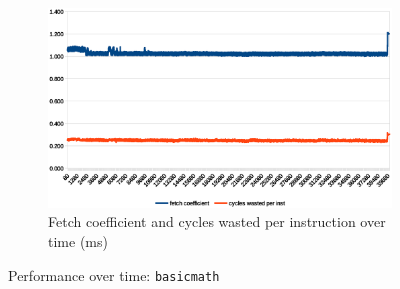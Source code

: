 \documentclass[../bachelor_paper.tex]{subfiles}
\begin{document}
\begin{figure}
\begin{subfigure}{0.45\textwidth}
        \includegraphics[width=\textwidth]{img/graph/mibench/basicmath_fetch_waste.eps}
        \caption{Fetch coefficient and cycles wasted per instruction over time (ms)}
    \end{subfigure}
    \caption{Performance over time: \texttt{basicmath}}
\end{figure}
\end{document}
